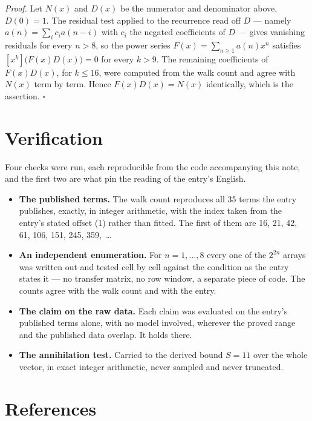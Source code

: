 \documentclass[11pt]{article}
\theoremstyle{definition}
\begin{document}
{\itshape Proof.} Let $N(x)$ and $D(x)$ be the numerator and denominator above, $D(0)=1$. The residual test applied to the recurrence read off $D$ --- namely $a(n) = \sum_i c_i a(n-i)$ with $c_i$ the negated coefficients of $D$ --- gives vanishing residuals for every $n > 8$, so the power series $F(x)=\sum_{n\ge 1}a(n)x^n$ satisfies $[x^k]\bigl(F(x)D(x)\bigr) = 0$ for every $k > 9$. The remaining coefficients of $F(x)D(x)$, for $k \le 16$, were computed from the walk count and agree with $N(x)$ term by term. Hence $F(x)D(x) = N(x)$ identically, which is the assertion. $\square$

\section{Verification}

Four checks were run, each reproducible from the code accompanying this note, and the first two are what pin the reading of the entry's English.

\begin{itemize}

\item {\bfseries The published terms.} The walk count reproduces all 35 terms the entry publishes, exactly, in integer arithmetic, with the index taken from the entry's stated offset (1) rather than fitted. The first of them are 16, 21, 42, 61, 106, 151, 245, 359,~\dots

\item {\bfseries An independent enumeration.} For $n = 1,\dots,8$ every one of the $2^{2n}$ arrays was written out and tested cell by cell against the condition as the entry states it --- no transfer matrix, no row window, a separate piece of code. The counts agree with the walk count and with the entry.

\item {\bfseries The claim on the raw data.} Each claim was evaluated on the entry's published terms alone, with no model involved, wherever the proved range and the published data overlap. It holds there.

\item {\bfseries The annihilation test.} Carried to the derived bound $S = 11$ over the whole vector, in exact integer arithmetic, never sampled and never truncated.

\end{itemize}

\section{References}
\end{document}
